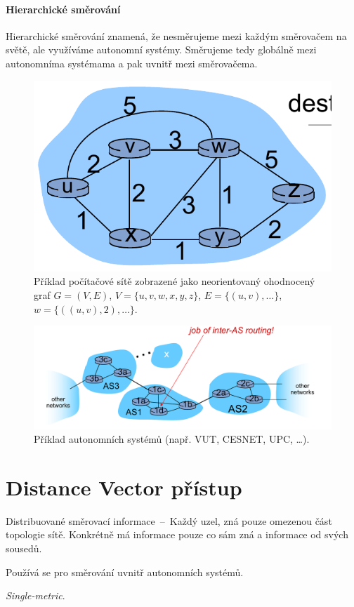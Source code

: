\paragraph*{Hierarchické směrování} Hierarchické směrování znamená, že nesměrujeme mezi každým směrovačem na světě, ale využíváme autonomní systémy. Směrujeme tedy globálně mezi autonomníma systémama a pak uvnitř mezi směrovačema.

\begin{figure}[H]
    \centering
    \includegraphics[width=0.5\linewidth]{network_abstraction.pdf}
    \caption{Příklad počítačové sítě zobrazené jako neorientovaný ohodnocený graf $G=(V, E)$, $V=\{u, v, w, x, y, z\}$, $E = \{ (u, v), \dots \}$, $w = \{ ((u, v), 2), \dots \}$.}
\end{figure}

\begin{figure}[H]
    \centering
    \includegraphics[width=1\linewidth]{autonomni_systemy.pdf}
    \caption{Příklad autonomních systémů (např. VUT, CESNET, UPC, \dots).}
\end{figure}


\section{Distance Vector přístup}

\begin{compactitem}
    \item Distribuované směrovací informace~--~Každý uzel, zná pouze omezenou část topologie sítě. Konkrétně má informace pouze co sám zná a informace od svých sousedů.
    \item Používá se pro směrování uvnitř autonomních systémů.
    \item \textit{Single-metric}.
\end{compactitem}


